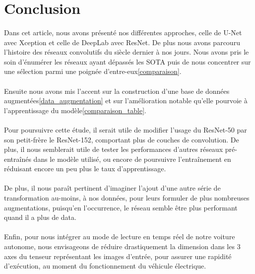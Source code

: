 \documentclass[
10pt, %
a4paper, %
oneside, %
headinclude,footinclude, %
]{scrartcl}
\begin{document}
\section{Conclusion}
\paragraph{}Dans cet article, nous avons présenté nos différentes approches, celle de U-Net avec Xception et celle de DeepLab avec ResNet. De plus nous avons parcouru l’histoire des réseaux convolutifs du siècle dernier à nos jours. Nous avons pris le soin d’énumérer les réseaux ayant dépassés les SOTA puis de nous concentrer sur une sélection parmi une poignée d’entre-eux\ref{comparaison}.

\paragraph{}Ensuite nous avons mis l’accent sur la construction d’une base de données augmentées\ref{data_augmentation} et sur l’amélioration notable qu’elle pourvoie à l’apprentissage du modèle\ref{comparaison_table}.

\paragraph{}Pour poursuivre cette étude, il serait utile de modifier l’usage du ResNet-50 par son petit-frère le ResNet-152, comportant plus de couches de convolution. De plus, il nous semblerait utile de tester les performances d’autres réseaux pré-entraînés dans le modèle utilisé, ou encore de poursuivre l’entraînement en réduisant encore un peu plus le taux d’apprentissage.

\paragraph{}De plus, il nous paraît pertinent d’imaginer l’ajout d’une autre série de transformation au-moins, à nos données, pour leurs formuler de plus nombreuses augmentations, puisqu’en l’occurrence, le réseau semble être plus performant quand il a plus de data.
\paragraph{}Enfin, pour nous intégrer au mode de lecture en temps réel de notre voiture autonome, nous envisageons de réduire drastiquement la dimension dans les 3 axes du tenseur représentant les images d’entrée, pour assurer une rapidité d’exécution, au moment du fonctionnement du véhicule électrique.
\end{document}
